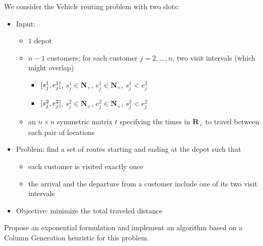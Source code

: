 \documentclass[a4paper,twocolumn]{article}
\newcommand{\N}{\mathbf{N}}
\newcommand{\R}{\mathbf{R}}
\begin{document}
We consider the Vehicle routing problem with two slots:
\begin{itemize}
  \item Input:
    \begin{itemize}
      \item $1$ depot
      \item $n - 1$ customers; for each customer $j = 2, \dots, n$, two visit intervals (which might overlap)
        \begin{itemize}
          \item $\interval[open right]{s_j^1}{e_j^1}$, $s_j^1 \in \N_+$, $e_j^1 \in \N_+$, $s_j^1 < e_j^2$
          \item $\interval[open right]{s_j^2}{e_j^2}$, $s_j^2 \in \N_+$, $e_j^2 \in \N_+$, $s_j^2 < e_j^2$
        \end{itemize}
      \item an $n \times n$ symmetric matrix $t$ specifying the times in $\R_+$ to travel between each pair of locations
    \end{itemize}
  \item Problem: find a set of routes starting and ending at the depot such that
    \begin{itemize}
      \item each customer is visited exactly once
      \item the arrival and the departure from a customer include one of its two visit intervals
    \end{itemize}
  \item Objective: minimize the total traveled distance
\end{itemize}

Propose an exponential formulation and implement an algorithm based on a Column Generation heuristic for this problem.
\end{document}
